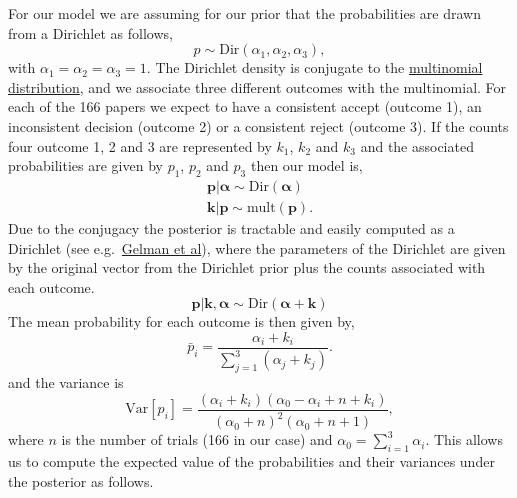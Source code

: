 For our model we are assuming for our prior that the probabilities are
drawn from a Dirichlet as follows, \[
p \sim \text{Dir}(\alpha_1, \alpha_2, \alpha_3),
\] with \(\alpha_1=\alpha_2=\alpha_3=1\). The Dirichlet density is
conjugate to the
\href{http://en.wikipedia.org/wiki/Multinomial_distribution}{multinomial
distribution}, and we associate three different outcomes with the
multinomial. For each of the 166 papers we expect to have a consistent
accept (outcome 1), an inconsistent decision (outcome 2) or a consistent
reject (outcome 3). If the counts four outcome 1, 2 and 3 are
represented by \(k_1\), \(k_2\) and \(k_3\) and the associated
probabilities are given by \(p_1\), \(p_2\) and \(p_3\) then our model
is, \begin{align*}
\mathbf{p}|\boldsymbol{\alpha} \sim \text{Dir}(\boldsymbol{\alpha}) \\
\mathbf{k}|\mathbf{p} \sim \text{mult}(\mathbf{p}).
\end{align*} Due to the conjugacy the posterior is tractable and easily
computed as a Dirichlet (see
e.g.~\href{http://www.stat.columbia.edu/~gelman/book/}{Gelman et al}),
where the parameters of the Dirichlet are given by the original vector
from the Dirichlet prior plus the counts associated with each outcome.
\[
\mathbf{p}|\mathbf{k}, \boldsymbol{\alpha} \sim \text{Dir}(\boldsymbol{\alpha} + \mathbf{k})
\] The mean probability for each outcome is then given by, \[
\bar{p}_i = \frac{\alpha_i+k_i}{\sum_{j=1}^3(\alpha_j + k_j)}.
\] and the variance is \[
\mathrm{Var}[p_i] = \frac{(\alpha_i+k_i) (\alpha_0-\alpha_i + n + k_i)}{(\alpha_0+n)^2 (\alpha_0+n+1)},
\] where \(n\) is the number of trials (166 in our case) and
\(\alpha_0 = \sum_{i=1}^3\alpha_i\). This allows us to compute the
expected value of the probabilities and their variances under the
posterior as follows.

